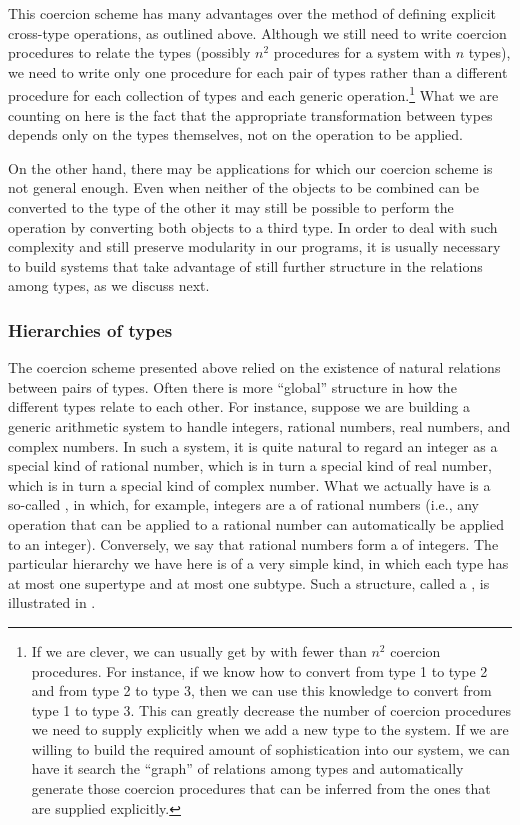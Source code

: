 \noindent
This coercion scheme has many advantages over the method of defining explicit
cross-type operations, as outlined above.  Although we still need to write
coercion procedures to relate the types (possibly \( n^2 \) procedures for a
system with \( n \) types), we need to write only one procedure for each pair of
types rather than a different procedure for each collection of types and each
generic operation.\footnote{If we are clever, we can usually get by with fewer
than \( n^2 \) coercion procedures.  For instance, if we know how to convert from
type 1 to type 2 and from type 2 to type 3, then we can use this knowledge to
convert from type 1 to type 3.  This can greatly decrease the number of
coercion procedures we need to supply explicitly when we add a new type to the
system.  If we are willing to build the required amount of sophistication into
our system, we can have it search the ``graph'' of relations among types and
automatically generate those coercion procedures that can be inferred from the
ones that are supplied explicitly.}  What we are counting on here is the fact
that the appropriate transformation between types depends only on the types
themselves, not on the operation to be applied.

On the other hand, there may be applications for which our coercion scheme is
not general enough.  Even when neither of the objects to be combined can be
converted to the type of the other it may still be possible to perform the
operation by converting both objects to a third type.  In order to deal with
such complexity and still preserve modularity in our programs, it is usually
necessary to build systems that take advantage of still further structure in
the relations among types, as we discuss next.

\subsubsection*{Hierarchies of types}

The coercion scheme presented above relied on the existence of natural
relations between pairs of types.  Often there is more ``global'' structure in
how the different types relate to each other.  For instance, suppose we are
building a generic arithmetic system to handle integers, rational numbers, real
numbers, and complex numbers.  In such a system, it is quite natural to regard
an integer as a special kind of rational number, which is in turn a special
kind of real number, which is in turn a special kind of complex number.  What
we actually have is a so-called , in which, for
example, integers are a  of rational numbers (i.e., any
operation that can be applied to a rational number can automatically be applied
to an integer).  Conversely, we say that rational numbers form a
 of integers.  The particular hierarchy we have here is of a
very simple kind, in which each type has at most one supertype and at most one
subtype.  Such a structure, called a , is illustrated in
.

